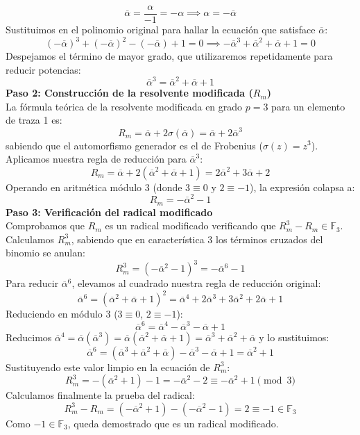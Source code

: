 \begin{enumerate}
\begin{dem}
$$ \overline{\alpha} = \frac{\alpha}{-1} = -\alpha \implies \alpha = -\overline{\alpha} $$
Sustituimos en el polinomio original para hallar la ecuación que satisface $\overline{\alpha}$:
$$ (-\overline{\alpha})^3 + (-\overline{\alpha})^2 - (-\overline{\alpha}) + 1 = 0 \implies -\overline{\alpha}^3 + \overline{\alpha}^2 + \overline{\alpha} + 1 = 0 $$
Despejamos el término de mayor grado, que utilizaremos repetidamente para reducir potencias:
$$ \overline{\alpha}^3 = \overline{\alpha}^2 + \overline{\alpha} + 1 $$
\textbf{Paso 2: Construcción de la resolvente modificada ($R_m$)} \\
La fórmula teórica de la resolvente modificada en grado $p=3$ para un elemento de traza 1 es:
$$ R_m = \overline{\alpha} + 2\sigma(\overline{\alpha}) =  \overline{\alpha} + 2\overline{\alpha}^3  $$
sabiendo que el automorfismo generador es el de Frobenius ($\sigma(z) = z^3$). Aplicamos nuestra regla de reducción para $\overline{\alpha}^3$:
$$ R_m = \overline{\alpha} + 2(\overline{\alpha}^2 + \overline{\alpha} + 1) = 2\overline{\alpha}^2 + 3\overline{\alpha} + 2 $$
Operando en aritmética módulo 3 (donde $3 \equiv 0$ y $2 \equiv -1$), la expresión colapsa a:
$$ R_m = -\overline{\alpha}^2 - 1 $$
\textbf{Paso 3: Verificación del radical modificado} \\
Comprobamos que $R_m$ es un radical modificado verificando que $R_m^3 - R_m \in \mathbb{F}_3$.
Calculamos $R_m^3$, sabiendo que en característica 3 los términos cruzados del binomio se anulan:
$$ R_m^3 = (-\overline{\alpha}^2 - 1)^3 = -\overline{\alpha}^6 - 1 $$
Para reducir $\overline{\alpha}^6$, elevamos al cuadrado nuestra regla de reducción original:
$$ \overline{\alpha}^6 = (\overline{\alpha}^2 + \overline{\alpha} + 1)^2 = \overline{\alpha}^4 + 2\overline{\alpha}^3 + 3\overline{\alpha}^2 + 2\overline{\alpha} + 1 $$
Reduciendo en módulo 3 ($3 \equiv 0$, $2 \equiv -1$):
$$ \overline{\alpha}^6 = \overline{\alpha}^4 - \overline{\alpha}^3 - \overline{\alpha} + 1 $$
Reducimos $\overline{\alpha}^4 = \overline{\alpha}(\overline{\alpha}^3) = \overline{\alpha}(\overline{\alpha}^2 + \overline{\alpha} + 1) = \overline{\alpha}^3 + \overline{\alpha}^2 + \overline{\alpha}$ y lo sustituimos:
$$ \overline{\alpha}^6 = (\overline{\alpha}^3 + \overline{\alpha}^2 + \overline{\alpha}) - \overline{\alpha}^3 - \overline{\alpha} + 1 = \overline{\alpha}^2 + 1 $$
Sustituyendo este valor limpio en la ecuación de $R_m^3$:
$$ R_m^3 = -(\overline{\alpha}^2 + 1) - 1 = -\overline{\alpha}^2 - 2 \equiv -\overline{\alpha}^2 + 1 \pmod 3 $$
Calculamos finalmente la prueba del radical:
$$ R_m^3 - R_m = (-\overline{\alpha}^2 + 1) - (-\overline{\alpha}^2 - 1) = 2 \equiv -1 \in \mathbb{F}_3 $$
Como $-1 \in \mathbb{F}_3$, queda demostrado que es un radical modificado.


\end{dem}
\end{enumerate}
